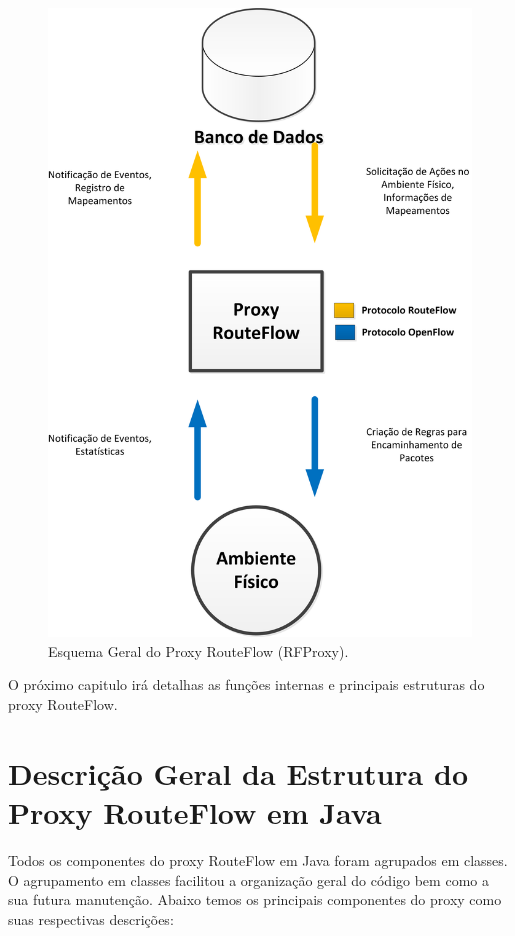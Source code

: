 \begin{figure}[h] 
\centering
\includegraphics[width=120mm]{esquematico_geral_proxy.png}
\caption{Esquema Geral do Proxy RouteFlow (RFProxy).}
\label{fig:esquematicoProxy} 
\end{figure}
 

O próximo capitulo irá detalhas as funções internas e principais
estruturas do proxy RouteFlow.

\section{Descrição Geral da Estrutura do Proxy RouteFlow em Java}

Todos os componentes do proxy RouteFlow em Java foram agrupados em classes.
O agrupamento em classes facilitou a 
organização geral do código bem como a sua futura manutenção. 
Abaixo temos os principais componentes do proxy como 
suas respectivas descrições:

